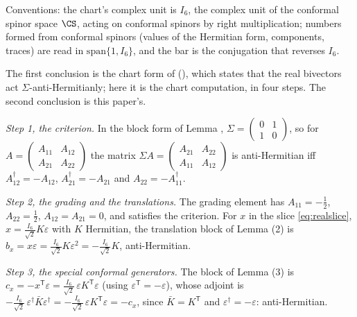 Conventions: the chart's complex unit is $I_{6}$, the complex unit of the conformal spinor space $\CS$, acting on conformal spinors by right multiplication; numbers formed from conformal spinors (values of the Hermitian form, components, traces) are read in $\mathrm{span}\{1, I_{6}\}$, and the bar is the conjugation that reverses $I_{6}$.

The first conclusion is the chart form of \cite[Prop.~4.5(2)]{ButlerT9} (), which states that the real bivectors act $\Sigma$-anti-Hermitianly; here it is the chart computation, in four steps. The second conclusion is this paper's.

\emph{Step 1, the criterion.} In the block form of Lemma , $\Sigma = \left(\begin{smallmatrix} 0 & 1 \\ 1 & 0\end{smallmatrix}\right)$, so for $A = \left(\begin{smallmatrix} A_{11} & A_{12} \\ A_{21} & A_{22}\end{smallmatrix}\right)$ the matrix $\Sigma A = \left(\begin{smallmatrix} A_{21} & A_{22} \\ A_{11} & A_{12}\end{smallmatrix}\right)$ is anti-Hermitian iff $A_{12}^{\dagger} = -A_{12}$, $A_{21}^{\dagger} = -A_{21}$ and $A_{22} = -A_{11}^{\dagger}$.

\emph{Step 2, the grading and the translations.} The grading element has $A_{11} = -\tfrac12$, $A_{22} = \tfrac12$, $A_{12} = A_{21} = 0$, and satisfies the criterion. For $x$ in the slice \eqref{eq:realslice}, $x = \tfrac{I_{6}}{\sqrt2}K\varepsilon$ with $K$ Hermitian, the translation block of Lemma (2) is $b_{x} = x\varepsilon = \tfrac{I_{6}}{\sqrt2}K\varepsilon^{2} = -\tfrac{I_{6}}{\sqrt2}K$, anti-Hermitian.

\emph{Step 3, the special conformal generators.} The block of Lemma (3) is $c_{x} = -x^{\mathsf T}\varepsilon = \tfrac{I_{6}}{\sqrt2}\,\varepsilon K^{\mathsf T}\varepsilon$ (using $\varepsilon^{\mathsf T} = -\varepsilon$), whose adjoint is $-\tfrac{I_{6}}{\sqrt2}\,\varepsilon^{\dagger}\bar{K}\varepsilon^{\dagger} = -\tfrac{I_{6}}{\sqrt2}\,\varepsilon K^{\mathsf T}\varepsilon = -c_{x}$, since $\bar K = K^{\mathsf T}$ and $\varepsilon^{\dagger} = -\varepsilon$: anti-Hermitian.

